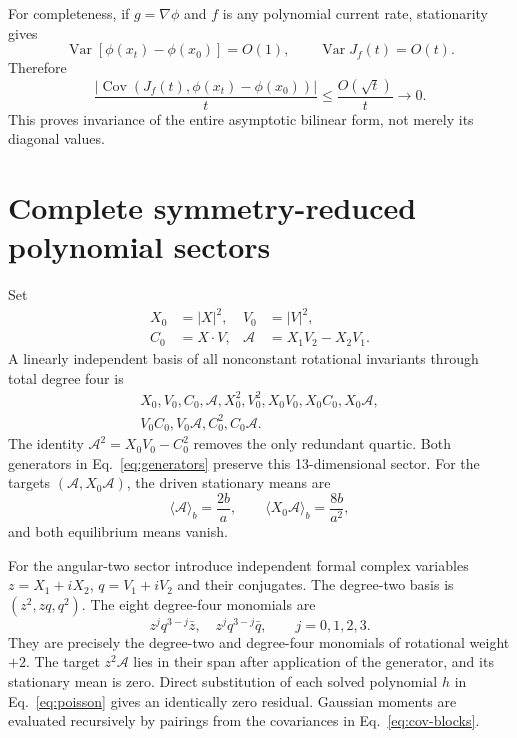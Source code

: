 \documentclass[aps,pre,reprint,amsmath,amssymb,superscriptaddress,nofootinbib]{revtex4-2}
\newcommand{\Var}{\operatorname{Var}}
\newcommand{\Cov}{\operatorname{Cov}}
\newcommand{\grad}{\nabla}
\newcommand{\cA}{\mathcal{A}}
\begin{document}
For completeness, if $g=\grad\phi$ and $f$ is any polynomial current rate,
stationarity gives
\begin{equation}
 \Var[\phi(x_t)-\phi(x_0)]=O(1),\qquad \Var J_f(t)=O(t).
\end{equation}
Therefore
\begin{equation}
 \frac{|\Cov(J_f(t),\phi(x_t)-\phi(x_0))|}{t}
 \le \frac{O(\sqrt t)}{t}\longrightarrow0.
\end{equation}
This proves invariance of the entire asymptotic bilinear form, not merely its
diagonal values.

\section{Complete symmetry-reduced polynomial sectors}
\label{app:closure}

Set
\begin{equation}
 \begin{aligned}
 X_0&=|X|^2,& V_0&=|V|^2,\\
 C_0&=X\cdot V,& \cA&=X_1V_2-X_2V_1.
 \end{aligned}
\end{equation}
A linearly independent basis of all nonconstant rotational invariants through
total degree four is
\begin{multline}
 X_0,V_0,C_0,\cA, X_0^2,V_0^2,X_0V_0,X_0C_0,X_0\cA,\\
 V_0C_0,V_0\cA,C_0^2,C_0\cA.
\end{multline}
The identity $\cA^2=X_0V_0-C_0^2$ removes the only redundant quartic.  Both
generators in Eq.~\eqref{eq:generators} preserve this 13-dimensional sector.
For the targets $(\cA,X_0\cA)$, the driven stationary means are
\begin{equation}
 \langle\cA\rangle_b=\frac{2b}{a},\qquad
 \langle X_0\cA\rangle_b=\frac{8b}{a^2},
\end{equation}
and both equilibrium means vanish.

For the angular-two sector introduce independent formal complex variables
$z=X_1+iX_2$, $q=V_1+iV_2$ and their conjugates.  The degree-two basis is
$(z^2,zq,q^2)$.  The eight degree-four monomials are
\begin{equation}
 z^j q^{3-j}\bar z,\quad z^j q^{3-j}\bar q,\qquad j=0,1,2,3.
\end{equation}
They are precisely the degree-two and degree-four monomials of rotational
weight $+2$.  The target $z^2\cA$ lies in their span after application of
the generator, and its stationary mean is zero.  Direct substitution of each
solved polynomial $h$ in Eq.~\eqref{eq:poisson} gives an identically zero
residual.  Gaussian moments are evaluated recursively by pairings from the
covariances in Eq.~\eqref{eq:cov-blocks}.
\end{document}
